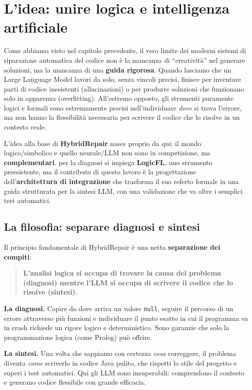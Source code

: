 \section{L'idea: unire logica e intelligenza artificiale}

Come abbiamo visto nel capitolo precedente, il vero limite dei moderni sistemi di
riparazione automatica del codice non è la mancanza di ``creatività'' nel generare
soluzioni, ma la mancanza di una \textbf{guida rigorosa}. Quando lasciamo che un Large Language
Model lavori da solo, senza vincoli precisi, finisce per inventare parti di codice inesistenti
(allucinazioni) o per produrre soluzioni che funzionano solo in apparenza (overfitting).
All'estremo opposto, gli strumenti puramente logici e formali sono estremamente precisi
nell'individuare \textit{dove} si trova l'errore, ma non hanno la flessibilità necessaria
per scrivere il codice che lo risolve in un contesto reale.

L'idea alla base di \textbf{HybridRepair} nasce proprio da qui: il mondo logico/simbolico
e quello neurale/LLM non sono in competizione, ma \textbf{complementari}. 
per la diagnosi si impiega \textbf{LogicFL}, uno strumento 
preesistente, ma il contributo di questo lavoro è la 
progettazione dell'\textbf{architettura di integrazione} che
trasforma il suo referto formale in una guida strutturata per
la sintesi LLM, con una validazione che va oltre i semplici
test automatici.

\subsection{La filosofia: separare diagnosi e sintesi}

Il principio fondamentale di HybridRepair è una netta \textbf{separazione dei compiti}:

\begin{quote}
\textbf{L'analisi logica si occupa di trovare la causa del problema (diagnosi) mentre l'LLM si occupa di scrivere il codice che lo risolve (sintesi).}
\end{quote}

\textbf{La diagnosi.} Capire da dove arriva un valore \texttt{null}, seguire il
percorso di un errore attraverso più funzioni e individuare il punto esatto in cui il
programma va in crash richiede un rigore logico e deterministico. Sono garanzie che solo
la programmazione logica (come Prolog) può offrire.

\textbf{La sintesi.} Una volta che sappiamo con certezza \textit{cosa}
correggere, il problema diventa \textit{come} scriverlo in codice Java pulito, che rispetti lo
stile del progetto e superi i test automatici. Qui gli LLM sono insuperabili: comprendono
il contesto e generano codice flessibile con grande efficacia.


